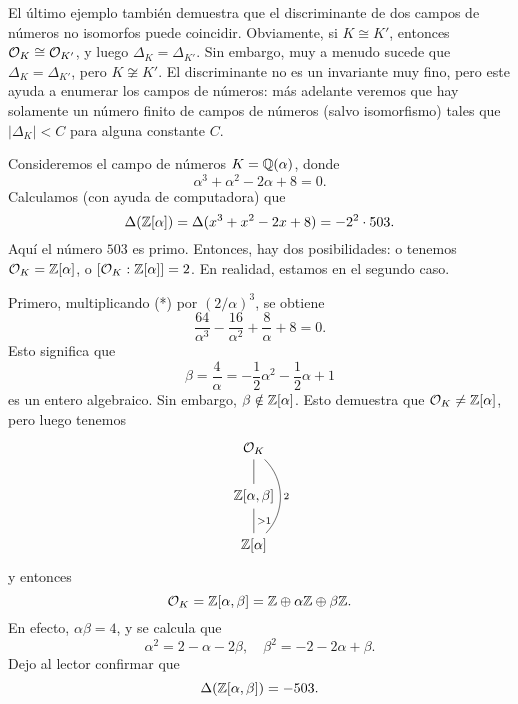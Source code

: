 \begin{comentario}
  El último ejemplo también demuestra que el discriminante de dos campos
  de números no isomorfos puede coincidir. Obviamente, si $K \cong K'$, entonces
  $\mathcal{O}_K \cong \mathcal{O}_{K'}$, y luego $\Delta_K = \Delta_{K'}$.
  Sin embargo, muy a menudo sucede que $\Delta_K = \Delta_{K'}$, pero
  $K \not\cong K'$. El discriminante no es un invariante muy fino, pero este
  ayuda a enumerar los campos de números: más adelante veremos que hay solamente
  un número finito de campos de números (salvo isomorfismo) tales que
  $|\Delta_K| < C$ para alguna constante $C$.
\end{comentario}

\begin{ejemplo}[Dedekind]
  Consideremos el campo de números $K = \mathbb{Q} (\alpha)$, donde
  \[ \tag{*} \alpha^3 + \alpha^2 - 2\alpha + 8 = 0. \]
  Calculamos (con ayuda de computadora) que
  $$\Delta (\mathbb{Z} [\alpha]) = \Delta (x^3 + x^2 - 2x + 8) = -2^2 \cdot 503.$$
  Aquí el número $503$ es primo. Entonces, hay dos posibilidades: o tenemos
  $\mathcal{O}_K = \mathbb{Z} [\alpha]$, o $[\mathcal{O}_K : \mathbb{Z} [\alpha]] = 2$.
  En realidad, estamos en el segundo caso.

  Primero, multiplicando (*) por $(2/\alpha)^3$, se obtiene
  $$\frac{64}{\alpha^3} - \frac{16}{\alpha^2} + \frac{8}{\alpha} + 8 = 0.$$
  Esto significa que
  $$\beta = \frac{4}{\alpha} = -\frac{1}{2} \alpha^2 - \frac{1}{2} \alpha + 1$$
  es un entero algebraico. Sin embargo, $\beta \notin \mathbb{Z} [\alpha]$. Esto
  demuestra que $\mathcal{O}_K \ne \mathbb{Z} [\alpha]$, pero luego tenemos
  \[ \begin{tikzcd}
    \O_K \ar[-]{d}\ar[-,bend left=45]{dd}{2} \\
    \ZZ [\alpha,\beta] \ar[-]{d}{> 1} \\
    \ZZ [\alpha]
  \end{tikzcd} \]
  y entonces
  $$\mathcal{O}_K = \mathbb{Z} [\alpha,\beta] = \mathbb{Z} \oplus \alpha\mathbb{Z} \oplus \beta\mathbb{Z}.$$
  En efecto, $\alpha\beta = 4$, y se calcula que
  $$\alpha^2 = 2 - \alpha - 2\beta, \quad \beta^2 = -2 - 2\alpha + \beta.$$
  Dejo al lector confirmar que
  $$\Delta (\mathbb{Z} [\alpha,\beta]) = -503.$$


\end{ejemplo}
